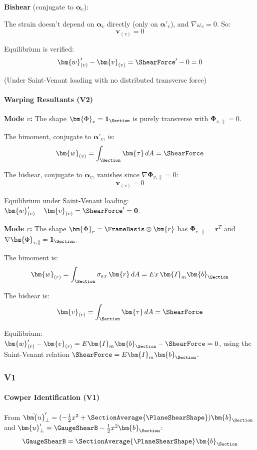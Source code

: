 \textbf{Bishear} (conjugate to \(\bm{\alpha}_v\)):

The strain doesn't depend on \(\bm{\alpha}_v\) directly (only on
\(\bm{\alpha}'_v\)), and \(\nabla\omega_v = 0\). So:
\[
\bm{v}_{(v)} = 0
\]

Equilibrium is verified:
\[
\bm{w}'_{(v)} - \bm{v}_{(v)} = \ShearForce' - {0} = {0}
\]

(Under Saint-Venant loading with no distributed transverse force)
\paragraph{Warping Resultants (V2)}

\textbf{Mode \(v\):} The shape \(\bm{\Phi}_v = \mathbf{1}_{\Section}\) is
purely transverse with \(\bm{\Phi}_{v,\parallel} = 0\).

The bimoment, conjugate to \(\bm{\alpha}'_v\), is:
\[
\bm{w}_{(v)} = \int_{\Section} \bm{\tau}\,dA = \ShearForce
\]

The bishear, conjugate to \(\bm{\alpha}_v\), vanishes since
\(\nabla\bm{\Phi}_{v,\parallel} = 0\): 
\[
\bm{v}_{(v)} = 0
\]

Equilibrium under Saint-Venant loading:
\(\bm{w}'_{(v)} - \bm{v}_{(v)} = \ShearForce' = \mathbf{0}\).

\textbf{Mode \(r\):} The shape \(\bm{\Phi}_r = \FrameBasis\otimes\bm{r}\) 
has \(\bm{\Phi}_{r,\parallel} = \bm{r}^T\) and
\(\nabla\bm{\Phi}_{r,\parallel} = \mathbf{1}_{\Section}\).

The bimoment is:
\[
\bm{w}_{(r)} = \int_{\Section} \sigma_{ax}\,\bm{r}\,dA = Ex\,\bm{I}_m\bm{b}_{\Section}
\]

The bishear is: 
\[
\bm{v}_{(r)} = \int_{\Section} \bm{\tau}\,dA = \ShearForce
\]

Equilibrium:
\(\bm{w}'_{(r)} - \bm{v}_{(r)} = E\bm{I}_m\bm{b}_{\Section} - \ShearForce = 0\),
using the Saint-Venant relation \(\ShearForce = E\bm{I}_m\bm{b}_{\Section}\).

\subsubsection{V1}

\paragraph{Cowper Identification (V1)}


From
\(\bar{\bm{u}}'_\perp = (-\tfrac{1}{2}x^2 + \SectionAverage{\PlaneShearShape})\bm{b}_{\Section}\)
and \(\bm{u}'_\perp = \GaugeShearB - \tfrac{1}{2}x^2\bm{b}_{\Section}\):
\[
\GaugeShearB = \SectionAverage{\PlaneShearShape}\bm{b}_{\Section}
\]

